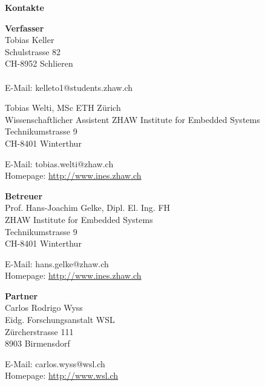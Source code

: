 %
%

{\large\textbf{Kontakte}}\vskip 15pt

\textbf{Verfasser} \\
Tobias Keller \\
Schulstrasse 82\\
CH-8952 Schlieren\\
\\
E-Mail: kelleto1@students.zhaw.ch\vskip 15pt

Tobias Welti, MSc ETH Zürich\\
Wissenschaftlicher Assistent
ZHAW Institute for Embedded Systems\\
Technikumstrasse 9\\
CH-8401 Winterthur

E-Mail: tobias.welti@zhaw.ch\\
Homepage: \url{http://www.ines.zhaw.ch}\vskip 15pt

\textbf{Betreuer} \\
Prof. Hans-Joachim Gelke, Dipl. El. Ing. FH\\
ZHAW Institute for Embedded Systems\\
Technikumstrasse 9\\
CH-8401 Winterthur

E-Mail: hans.gelke@zhaw.ch\\
Homepage: \url{http://www.ines.zhaw.ch}\vskip 15pt

\textbf{Partner} \\
Carlos Rodrigo Wyss\\
Eidg. Forschungsanstalt WSL\\
Zürcherstrasse 111\\
8903 Birmensdorf

E-Mail: carlos.wyss@wsl.ch\\
Homepage: \url{http://www.wsl.ch}\vskip 15pt